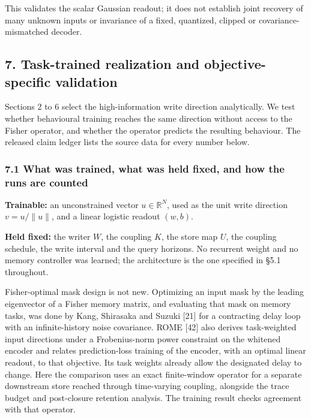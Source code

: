 \documentclass[
  10pt,
]{article}
\begin{document}
This validates the scalar Gaussian readout; it does not establish joint
recovery of many unknown inputs or invariance of a fixed, quantized,
clipped or covariance-mismatched decoder.

\subsection{7. Task-trained realization and objective-specific
validation}\label{task-trained-realization-and-objective-specific-validation}

Sections 2 to 6 select the high-information write direction
analytically. We test whether behavioural training reaches the same
direction without access to the Fisher operator, and whether the
operator predicts the resulting behaviour. The released claim ledger
lists the source data for every number below.

\subsubsection{7.1 What was trained, what was held fixed, and how the
runs are
counted}\label{what-was-trained-what-was-held-fixed-and-how-the-runs-are-counted}

\textbf{Trainable:} an unconstrained vector \(u\in\mathbb R^{N}\), used
as the unit write direction \(v=u/\lVert u\rVert\), and a linear
logistic readout \((w,b)\).

\textbf{Held fixed:} the writer \(W\), the coupling \(K\), the store map
\(U\), the coupling schedule, the write interval and the query horizons.
No recurrent weight and no memory controller was learned; the
architecture is the one specified in §5.1 throughout.

Fisher-optimal mask design is not new. Optimizing an input mask by the
leading eigenvector of a Fisher memory matrix, and evaluating that mask
on memory tasks, was done by Kang, Shirasaka and Suzuki {[}21{]} for a
contracting delay loop with an infinite-history noise covariance. ROME
{[}42{]} also derives task-weighted input directions under a
Frobenius-norm power constraint on the whitened encoder and relates
prediction-loss training of the encoder, with an optimal linear readout,
to that objective. Its task weights already allow the designated delay
to change. Here the comparison uses an exact finite-window operator for
a separate downstream store reached through time-varying coupling,
alongside the trace budget and post-closure retention analysis. The
training result checks agreement with that operator.
\end{document}
